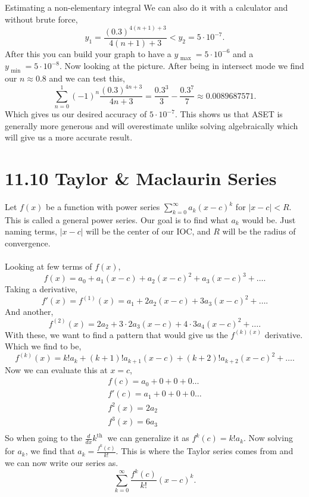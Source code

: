 \documentclass[a4paper]{article}
\begin{document}
\begin{exampleblock}{Estimating a non-elementary integral}
We can also do it with a calculator and without brute force,
\[
y_1 = \frac{ \left( 0.3 \right) ^{ 4\left( n+1 \right) +3 } }{ 4\left( n+1 \right) +3 }< y_2 = 5\cdot 10^{ -7 }
.\] 
After this you can build your graph to have a $ y_{ \text{ max } }= 5\cdot 10^{ -6 } $ and a $ y_{ \text{ min } }= 5\cdot 10^{ -8 } $. Now looking at the picture. After being in intersect mode we find our $ n\approx 0.8 $ and we can test this,
\[
\sum_{ n=0 } ^{ 1 } \left( -1 \right) ^{ n } \frac{ \left( 0.3 \right) ^{ 4n+3 } }{ 4n+3 } = \frac{ 0.3^{ 3 } }{ 3 }- \frac{ 0.3^{ 7 } }{ 7 } \approx 0.0089687571
.\] 
Which gives us our desired accuracy of $ 5\cdot 10^{ -7 } $. This shows us that ASET is generally more generous and will overestimate unlike solving algebraically which will give us a more accurate result.
\end{exampleblock}
\section{11.10 Taylor \& Maclaurin Series}%
Let $ f\left( x \right)  $ be a function with power series $ \sum_{ k=0 } ^{ \infty } a_k\left( x-c \right) ^{ k } $ for $ \left| x-c \right|<R $. This is called a general power series. Our goal is to find what $ a_k $ would be. Just naming terms, $ \left| x-c \right| $ will be the center of our IOC, and $ R $ will be the radius of convergence. \\ \\

Looking at few terms of $ f\left( x \right)  $,
\[
f\left( x \right) =a_0 + a_1\left( x-c \right) + a_2\left( x-c \right) ^{ 2 } + a_3\left( x-c \right) ^{ 3 } + \ldots
.\] 
Taking a derivative,
\[
f'\left( x \right) = f^{ \left( 1 \right)  }\left( x \right) = a_1 + 2a_2\left( x-c \right) + 3a_3\left( x-c \right) ^{ 2 } + \ldots
.\] 
And another,
\[
f^{ \left( 2 \right)  }\left( x \right) = 2a_2 + 3\cdot 2a_3\left( x-c \right) + 4\cdot 3a_4\left( x-c \right) ^{ 2 } + \ldots
.\] 
With these, we want to find a pattern that would give us the $ f^{ \left( k \right) \left( x \right)  } $ derivative. Which we find to be,
\[
f^{ \left( k \right)  }\left( x \right) = k!a_k + \left( k+1 \right)! a_{ k+1 }\left( x-c \right) + \left( k+2 \right) ! a_{ k+2 }\left( x-c \right) ^2 + \ldots
.\] 
Now we can evaluate this at $ x=c $,
\begin{gather*}
f\left( c \right) =a_0 + 0 + 0 + 0\ldots \\
f'\left( c \right) = a_1 + 0 + 0 + 0 \ldots \\
f^{ 2 }\left( x \right) = 2a_2 \\
f^{ 3 }\left( x \right) = 6a_3 \\
\end{gather*}
So when going to the $ \frac{ d }{ dx } k^{ \text{th } } $ we can generalize it as $ f^{ k }\left( c \right) = k!a_k $. Now solving for $ a_k $, we find that $ a_k=\frac{ f^{ k }\left( c \right)  }{ k! } $. This is where the Taylor series comes from and we can now write our series as.
\[
\sum_{ k=0 } ^{ \infty } \frac{ f^{ k }\left( c \right)  }{ k! }\left( x-c \right) ^{ k }
.\] 
\end{document}
